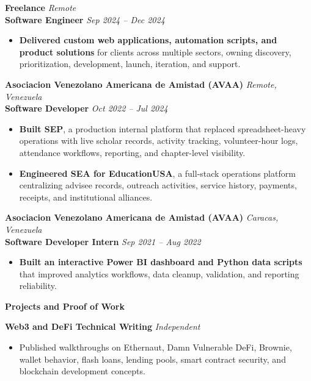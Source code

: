 \documentclass[11pt]{article}
\begin{document}
\vspace{6pt}
\textbf{Freelance} \hfill \textit{Remote} \\
\textbf{Software Engineer} \hfill \textit{Sep 2024 -- Dec 2024}
\begin{itemize}
    \item \textbf{Delivered custom web applications, automation scripts, and product solutions} for clients across multiple sectors, owning discovery, prioritization, development, launch, iteration, and support.
\end{itemize}

\vspace{6pt}
\textbf{Asociacion Venezolano Americana de Amistad (AVAA)} \hfill \textit{Remote, Venezuela} \\
\textbf{Software Developer} \hfill \textit{Oct 2022 -- Jul 2024}
\begin{itemize}
    \item \textbf{Built SEP}, a production internal platform that replaced spreadsheet-heavy operations with live scholar records, activity tracking, volunteer-hour logs, attendance workflows, reporting, and chapter-level visibility.
    \item \textbf{Engineered SEA for EducationUSA}, a full-stack operations platform centralizing advisee records, outreach activities, service history, payments, receipts, and institutional alliances.
\end{itemize}

\vspace{6pt}
\textbf{Asociacion Venezolano Americana de Amistad (AVAA)} \hfill \textit{Caracas, Venezuela} \\
\textbf{Software Developer Intern} \hfill \textit{Sep 2021 -- Aug 2022}
\begin{itemize}
    \item \textbf{Built an interactive Power BI dashboard and Python data scripts} that improved analytics workflows, data cleanup, validation, and reporting reliability.
\end{itemize}

\vspace{7pt}
\begin{center}
    \textbf{Projects and Proof of Work}
\end{center}
\vspace{-4pt}

\textbf{Web3 and DeFi Technical Writing} \hfill \textit{Independent}
\begin{itemize}
    \item Published walkthroughs on Ethernaut, Damn Vulnerable DeFi, Brownie, wallet behavior, flash loans, lending pools, smart contract security, and blockchain development concepts.
\end{itemize}
\end{document}
